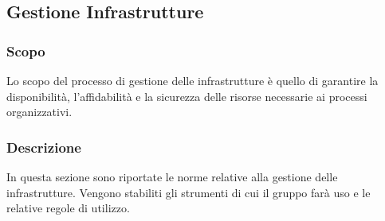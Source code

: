 \subsection{Gestione Infrastrutture}
\subsubsection{Scopo} 
Lo scopo del processo di gestione delle infrastrutture è quello di garantire la disponibilità, l’affidabilità e la sicurezza delle risorse necessarie ai processi organizzativi.
\subsubsection{Descrizione}
In questa sezione sono riportate le norme relative alla gestione delle infrastrutture. Vengono stabiliti gli strumenti di cui il gruppo farà uso e le relative regole di utilizzo.


